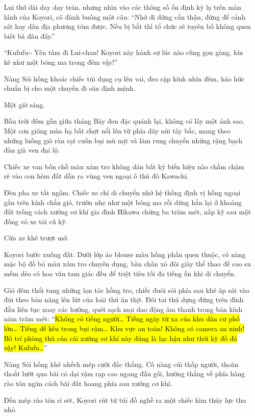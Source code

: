 \documentclass[../main.tex]{subfiles}
\begin{document}
Lui thở dài day day trán, nhưng nhìn vào các thông số ổn định kỳ lạ trên màn hình của Koyori, cô đành buông một câu: ``Nhớ đi đứng cẩn thận, đừng để cảnh sát hay dân địa phương tóm được. Nếu bị bắt thì tổ chức sẽ tuyên bố không quen biết bà đâu đấy.''

``Kufufu\~{} Yên tâm đi Lui-chan! Koyori này hành sự lúc nào cũng gọn gàng, kín kẽ như một bóng ma trong đêm vậy!''

Nàng Sói hồng khoác chiếc túi dụng cụ lên vai, đeo cặp kính nhìn đêm, háo hức chuẩn bị cho một chuyến đi săn định mệnh.

\ct

Một giờ sáng.

Bầu trời đêm gần giữa tháng Bảy đen đặc quánh lại, không có lấy một ánh sao. Một cơn giông mùa hạ bất chợt nổi lên từ phía dãy núi tây bắc, mang theo những luồng gió ràn rạt cuốn bụi mù mịt và làm rung chuyển những rặng bạch đàn già ven đại lộ.

Chiếc xe van bốn chỗ màu xám tro không dán bất kỳ biển hiệu nào chầm chậm rẽ vào con hẻm đất dẫn ra vùng ven ngoại ô thủ đô Kawachi.

Đèn pha xe tắt ngấm. Chiếc xe chỉ di chuyển nhờ hệ thống định vị hồng ngoại gắn trên kính chắn gió, trườn nhẹ như một bóng ma rồi dừng hẳn lại ở khoảng đất trống cách xưởng cơ khí gia đình Hikawa chừng ba trăm mét, nấp kỹ sau một đống vỏ xe tải cũ kỹ.

Cửa xe khẽ trượt mở.

Koyori bước xuống đất. Dưới lớp áo blouse màu hồng phấn quen thuộc, cô nàng mặc bộ đồ bó màu xám tro chuyên dụng, bàn chân xỏ đôi giày thể thao đế cao su mềm dẻo có hoa văn tam giác đều để triệt tiêu tối đa tiếng ồn khi di chuyển.

Gió đêm thổi tung những lọn tóc hồng tro, chiếc đuôi sói phía sau khẽ áp sát vào đùi theo bản năng lén lút của loài thú ăn thịt. Đôi tai thú dựng đứng trên đỉnh đầu liên tục xoay các hướng, quét sạch mọi dao động âm thanh trong bán kính năm trăm mét: ``\hl{Không có tiếng người\dots{} Tiếng ngáy từ xa của khu dân cư phố lớn\dots{} Tiếng dế kêu trong bụi rậm\dots{} Khu vực an toàn! Không có camera an ninh! Bố trí phòng thủ của cái xưởng cơ khí này đúng là lạc hậu như thời kỳ đồ đá vậy! Kufufu\dots}''

Nàng Sói hồng khẽ nhếch mép cười đắc thắng. Cô nàng cúi thấp người, thoăn thoắt lướt qua bãi cỏ dại rậm rạp cao ngang đầu gối, hướng thẳng về phía hàng rào tôn ngăn cách bãi đất hoang phía sau xưởng cơ khí.

Đến mép rào tôn rỉ sét, Koyori rút từ túi đồ nghề ra một chiếc kìm thủy lực thu nhỏ.
\end{document}
